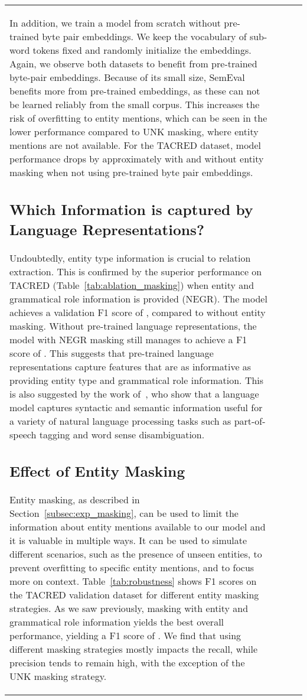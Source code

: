 \documentclass[akbc,twoside,11pt]{article}
\begin{document}
\begin{table}[ht!]
\begin{tabular}{p{6cm} l l l}
In addition, we train a model from scratch without pre-trained byte pair embeddings. We keep the vocabulary of sub-word tokens fixed and randomly initialize the embeddings. Again, we observe both datasets to benefit from pre-trained byte-pair embeddings. Because of its small size, SemEval benefits more from pre-trained embeddings, as these can not be learned reliably from the small corpus. This increases the risk of overfitting to entity mentions, which can be seen in the lower performance compared to UNK masking, where entity mentions are not available. For the TACRED dataset, model performance drops by approximately  with and without entity masking when not using pre-trained byte pair embeddings. 


\subsection{Which Information is captured by Language Representations?}
Undoubtedly, entity type information is crucial to relation extraction. This is confirmed by the superior performance on TACRED (Table~\ref{tab:ablation_masking}) when entity and grammatical role information is provided (NEGR). The model achieves a validation F1 score of , compared to  without entity masking. Without pre-trained language representations, the model with NEGR masking still manages to achieve a F1 score of . This suggests that pre-trained language representations capture features that are as informative as providing entity type and grammatical role information.
This is also suggested by the work of~\citet{peters_deepcw_2018}, who show that a language model captures syntactic and semantic information useful for a variety of natural language processing tasks such as part-of-speech tagging and word sense disambiguation.


\subsection{Effect of Entity Masking}
\label{subsec:effect_entity_masking}
Entity masking, as described in Section~\ref{subsec:exp_masking}, can be used to limit the information about entity mentions available to our model and it is valuable in multiple ways. It can be used to simulate different scenarios, such as the presence of unseen entities, to prevent overfitting to specific entity mentions, and to focus more on context. Table~\ref{tab:robustness} shows F1 scores on the TACRED validation dataset for different entity masking strategies. As we saw previously, masking with entity and grammatical role information yields the best overall performance, yielding a F1 score of . We find that using different masking strategies mostly impacts the recall, while precision tends to remain high, with the exception of the UNK masking strategy. 


\end{tabular}
\end{table}
\end{document}

